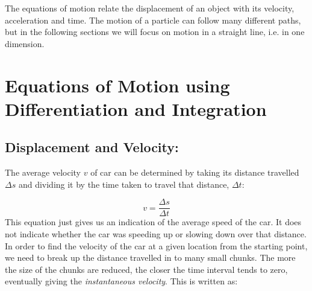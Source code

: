 





\addtolength{\topmargin}{-0.7 cm}
\setlength{\columnsep}{22pt}
\nll
The equations of motion relate the displacement of an object with its velocity, acceleration and time. The motion of a particle can follow many different paths, but in the following sections we will focus on motion in a straight line, i.e. in one dimension. 

\section{Equations of Motion using Differentiation and Integration}
\subsection{Displacement and Velocity:}
The average velocity $v$ of car can be determined by taking its distance travelled $\Delta s$ and dividing it by the time taken to travel that distance, $\Delta t$:

\begin{equation}
v = \frac{\Delta s}{\Delta t}   
\end{equation}
This equation just gives us an indication of the average speed of the car. It does not indicate whether the car was speeding up or slowing down over that distance. In order to find the velocity of the car at a given location from the starting point, we need to break up the distance travelled in to many small chunks. The more the size of the chunks are reduced, the closer the time interval tends to zero, eventually giving the \textit{instantaneous velocity}. This is written as:

